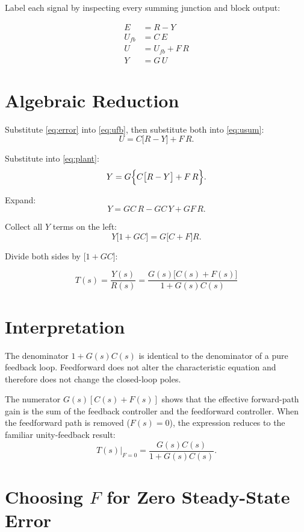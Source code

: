 \documentclass[11pt]{article}
\begin{document}
Label each signal by inspecting every summing junction and block output:

\begin{align}
  E     &= R - Y                        \label{eq:error}      \\
  U_{fb}&= C\,E                         \label{eq:ufb}        \\
  U     &= U_{fb} + F\,R               \label{eq:usum}       \\
  Y     &= G\,U                         \label{eq:plant}
\end{align}

\section*{Algebraic Reduction}

Substitute \eqref{eq:error} into \eqref{eq:ufb}, then substitute both into
\eqref{eq:usum}:
\[
  U = C\bigl[R - Y\bigr] + F\,R.
\]

Substitute into \eqref{eq:plant}:
\[
  Y = G\Bigl\{C\bigl[R-Y\bigr] + F\,R\Bigr\}.
\]

Expand:
\[
  Y = GC\,R - GC\,Y + GF\,R.
\]

Collect all $Y$ terms on the left:
\[
  Y\bigl[1 + GC\bigr] = G\bigl[C + F\bigr]R.
\]

Divide both sides by $\bigl[1 + GC\bigr]$:

\[
  \boxed{T(s) = \frac{Y(s)}{R(s)} = \frac{G(s)\bigl[C(s)+F(s)\bigr]}{1+G(s)C(s)}}
\]

\section*{Interpretation}

The denominator $1 + G(s)C(s)$ is identical to the denominator of a pure
feedback loop.  Feedforward does not alter the characteristic equation and
therefore does not change the closed-loop poles.

The numerator $G(s)[C(s)+F(s)]$ shows that the effective forward-path gain is
the sum of the feedback controller and the feedforward controller.  When the
feedforward path is removed ($F(s)=0$), the expression reduces to the familiar
unity-feedback result:
\[
  T(s)\big|_{F=0} = \frac{G(s)C(s)}{1+G(s)C(s)}.
\]

\section*{Choosing $F$ for Zero Steady-State Error}
\end{document}
